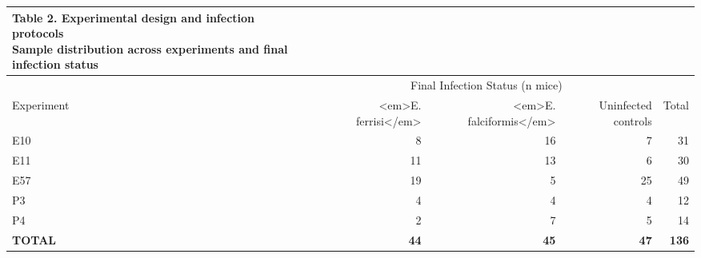 \begin{longtable}{lrrrr}
\caption*{
{\large Table 2. Experimental design and infection protocols} \\ 
{\small Sample distribution across experiments and final infection status}
} \\ 
\toprule
 & \multicolumn{3}{c}{Final Infection Status (n mice)} &  \\ 
\cmidrule(lr){2-4}
Experiment & <em>E. ferrisi</em> & <em>E. falciformis</em> & Uninfected controls & Total \\ 
\midrule\addlinespace[2.5pt]
E10 & 8 & 16 & 7 & 31 \\ 
E11 & 11 & 13 & 6 & 30 \\ 
E57 & 19 & 5 & 25 & 49 \\ 
P3 & 4 & 4 & 4 & 12 \\ 
P4 & 2 & 7 & 5 & 14 \\ 
\textbf{TOTAL} & \textbf{44} & \textbf{45} & \textbf{47} & \textbf{136} \\ 
\bottomrule
\end{longtable}

